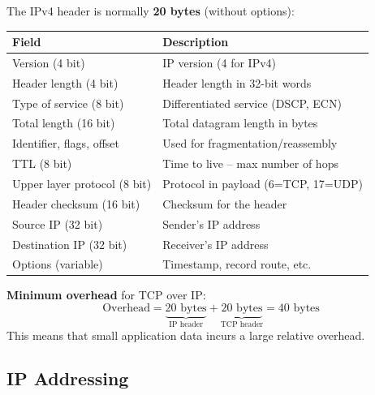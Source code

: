 \begin{keybox}
The IPv4 header is normally \textbf{20 bytes} (without options):

\begin{center}
\begin{tabular}{ll}
\toprule
\textbf{Field} & \textbf{Description} \\
\midrule
Version (4 bit) & IP version (4 for IPv4) \\
Header length (4 bit) & Header length in 32-bit words \\
Type of service (8 bit) & Differentiated service (DSCP, ECN) \\
Total length (16 bit) & Total datagram length in bytes \\
Identifier, flags, offset & Used for fragmentation/reassembly \\
TTL (8 bit) & Time to live -- max number of hops \\
Upper layer protocol (8 bit) & Protocol in payload (6=TCP, 17=UDP) \\
Header checksum (16 bit) & Checksum for the header \\
Source IP (32 bit) & Sender's IP address \\
Destination IP (32 bit) & Receiver's IP address \\
Options (variable) & Timestamp, record route, etc. \\
\bottomrule
\end{tabular}
\end{center}
\end{keybox}

\begin{imagebox}
\end{imagebox}

\begin{formulabox}[Overhead]
\textbf{Minimum overhead} for TCP over IP:
\[
\text{Overhead} = \underbrace{20 \text{ bytes}}_{\text{IP header}} + \underbrace{20 \text{ bytes}}_{\text{TCP header}} = 40 \text{ bytes}
\]
This means that small application data incurs a large relative overhead.
\end{formulabox}

\subsection{IP Addressing}

